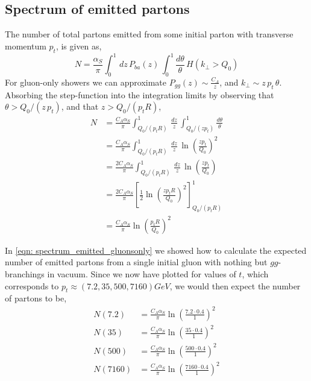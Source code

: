 \documentclass[main.tex]{subfiles}
\begin{document}
\subsection{Spectrum of emitted partons}
The number of total partons emitted from some initial parton with transverse momentum \(p_t\), is given as, 
\begin{equation}
    N = \frac{\alpha_S}{\pi} \int_0^1 \, dz\, P_{ba}(z)\, \int_0^1 \frac{d\theta}{\theta} \, H(k_\perp > Q_0)
\end{equation}
For gluon-only showers we can approximate \(P_{gg}(z) \sim \frac{C_A}{z}\), and \(k_\perp \sim z\, p_t\,\theta\). Absorbing the step-function into the integration limits by observing that \(\theta>Q_0/(z\,p_t)\), and that \(z > Q_0/(p_t R)\),
\begin{align}\label{eqn: spectrum_emitted_gluonsonly}
    N &= \frac{C_A \alpha_S}{\pi} \int_{Q_0/(p_tR)}^1 \, \frac{dz}{z}\, \int_{Q_0/(zp_t)}^1 \frac{d\theta}{\theta} \nonumber \\
    &= \frac{C_A \alpha_S}{\pi} \int_{Q_0/(p_tR)}^1 \, \frac{dz}{z}\, \ln(\frac{zp_t}{Q_0})^2 \nonumber \\
    &= \frac{2C_A \alpha_S}{\pi} \int_{Q_0/(p_tR)}^1 \, \frac{dz}{z}\, \ln(\frac{zp_t}{Q_0}) \nonumber \\
    &= \frac{2C_A \alpha_S}{\pi} \left[\frac{1}{2} \ln(\frac{zp_t R}{Q_0})^2 \right]_{Q_0/(p_tR)}^1 \nonumber \\
    &= \frac{C_A \alpha_S}{\pi} \ln(\frac{p_t R}{Q_0})^2 
\end{align}

In \autoref{eqn: spectrum_emitted_gluonsonly} we showed how to calculate the expected number of emitted partons from a single initial gluon with nothing but \(gg\)-branchings in vacuum. Since we now have plotted for values of \(t\), which corresponds to \(p_t \approx (7.2, 35, 500, 7160) GeV \), we would then expect the number of partons to be, 
\begin{align}
    N(7.2) &=  \frac{C_A \alpha_S}{\pi} \ln(\frac{7.2 \cdot 0.4}{1})^2 \\
    N(35) &=  \frac{C_A \alpha_S}{\pi} \ln(\frac{35 \cdot 0.4}{1})^2  \\
    N(500) &=  \frac{C_A \alpha_S}{\pi} \ln(\frac{500 \cdot 0.4}{1})^2 \\
    N(7160) &=  \frac{C_A \alpha_S}{\pi} \ln(\frac{7160 \cdot 0.4}{1})^2 
\end{align}
\end{document}
